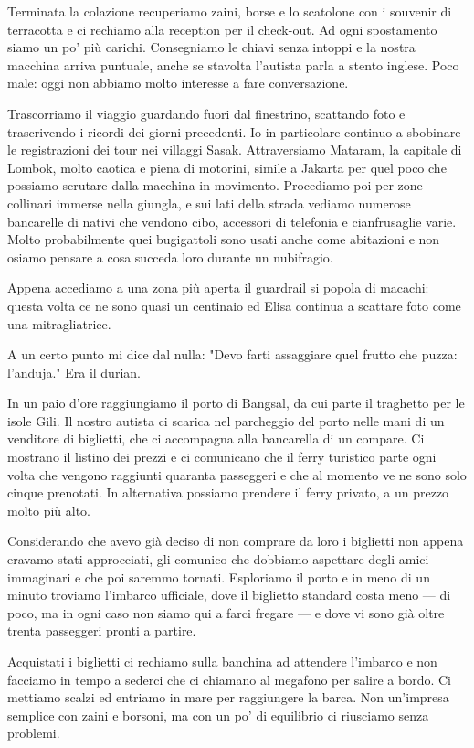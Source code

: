 Terminata la colazione recuperiamo zaini, borse e lo scatolone con i souvenir di terracotta e ci rechiamo alla reception per il check-out. Ad ogni spostamento siamo un po' più carichi. Consegniamo le chiavi senza intoppi e la nostra macchina arriva puntuale, anche se stavolta l'autista parla a stento inglese. Poco male: oggi non abbiamo molto interesse a fare conversazione.

Trascorriamo il viaggio guardando fuori dal finestrino, scattando foto e trascrivendo i ricordi dei giorni precedenti. Io in particolare continuo a sbobinare le registrazioni dei tour nei villaggi Sasak. Attraversiamo Mataram, la capitale di Lombok, molto caotica e piena di motorini, simile a Jakarta per quel poco che possiamo scrutare dalla macchina in movimento. Procediamo poi per zone collinari immerse nella giungla, e sui lati della strada vediamo numerose bancarelle di nativi che vendono cibo, accessori di telefonia e cianfrusaglie varie. Molto probabilmente quei bugigattoli sono usati anche come abitazioni e non osiamo pensare a cosa succeda loro durante un nubifragio.

Appena accediamo a una zona più aperta il guardrail si popola di macachi: questa volta ce ne sono quasi un centinaio ed Elisa continua a scattare foto come una mitragliatrice.

A un certo punto mi dice dal nulla: "Devo farti assaggiare quel frutto che puzza: l'anduja." Era il durian.

In un paio d'ore raggiungiamo il porto di Bangsal, da cui parte il traghetto per le isole Gili. Il nostro autista ci scarica nel parcheggio del porto nelle mani di un venditore di biglietti, che ci accompagna alla bancarella di un compare. Ci mostrano il listino dei prezzi e ci comunicano che il ferry turistico parte ogni volta che vengono raggiunti quaranta passeggeri e che al momento ve ne sono solo cinque prenotati. In alternativa possiamo prendere il ferry privato, a un prezzo molto più alto.

Considerando che avevo già deciso di non comprare da loro i biglietti non appena eravamo stati approcciati, gli comunico che dobbiamo aspettare degli amici immaginari e che poi saremmo tornati. Esploriamo il porto e in meno di un minuto troviamo l'imbarco ufficiale, dove il biglietto standard costa meno — di poco, ma in ogni caso non siamo qui a farci fregare — e dove vi sono già oltre trenta passeggeri pronti a partire.

Acquistati i biglietti ci rechiamo sulla banchina ad attendere l'imbarco e non facciamo in tempo a sederci che ci chiamano al megafono per salire a bordo. Ci mettiamo scalzi ed entriamo in mare per raggiungere la barca. Non un'impresa semplice con zaini e borsoni, ma con un po' di equilibrio ci riusciamo senza problemi.

